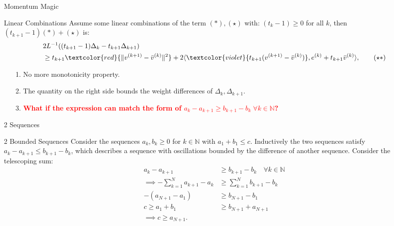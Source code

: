 \documentclass[11pt]{beamer}
\begin{document}
        \begin{frame}{Momentum Magic}
            \begin{block}{Linear Combinations}
                Assume some linear combinations of the term $(*), (\star)$ with: $(t_k - 1)\ge 0$ for all $k$, then $(t_{k + 1}- 1)(*) + (\star)$ is:
                \begin{align*}
                    & 2L^{-1}((t_{k + 1} - 1)\Delta_k - t_{k + 1}\Delta_{k + 1})
                    \\
                    & \ge 
                    t_{k + 1}
                    \textcolor{red}{\Vert v^{(k + 1)} - \bar v^{(k)}\Vert^2} + 
                    2\langle 
                        \textcolor{violet}{t_{k + 1}(v^{(k + 1)} - \bar v^{(k)})}, e^{(k)} + t_{k + 1} \bar v^{(k)}
                    \rangle, 
                    \tag{$\star*$}
                \end{align*}
            \end{block}
            \begin{itemize}
                \item [1.] No more monotonicity property. 
                \item [2.] The quantity on the right side bounds the weight differences of $\Delta_k, \Delta_{k +1}$. 
                \item [3.] \textbf{\textcolor{red}{What if the expression can match the form of $a_k - a_{k + 1} \ge b_{k + 1} - b_k \;\forall k\in \mathbb N$? }}
            \end{itemize}
        \end{frame}
        \begin{frame}{2 Sequences}
            \begin{lemma}{2 Bounded Sequences}
                Consider the sequences $a_k, b_k \ge 0$ for $k\in \mathbb N$ with $a_1 + b_1 \le c$. Inductively the two sequences satisfy $a_{k} - a_{k + 1} \le b_{k + 1} - b_k$, which describes a sequence with oscillations bounded by the difference of another sequence. Consider the telescoping sum: 
                \begin{align*}
                    a_{k} - a_{k + 1} 
                    &\ge b_{k + 1} - b_k \quad \forall k \in \mathbb N
                    \\
                    \implies
                    -\sum_{k = 1}^{N}
                    a_{k + 1} - a_k 
                    &\ge 
                    \sum_{k = 1}^{N} b_{k + 1} - b_k
                    \\
                    - (a_{N + 1} - a_1) 
                    &\ge b_{N + 1} - b_1
                    \\
                    c\ge a_1 + b_1
                    &\ge
                    b_{N + 1} + a_{N +1}
                    \\
                    \implies c \ge a_{N+1}. 
                \end{align*}
            \end{lemma}
        \end{frame}
\end{document}
